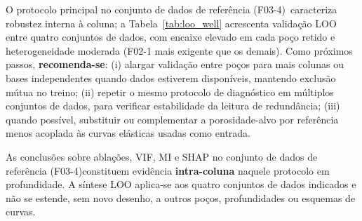 \documentclass[12pt,a4paper]{article}
\newcommand{\dadosref}{conjunto de dados de referência (F03-4)}
\begin{document}
O protocolo principal no \dadosref\ caracteriza robustez interna à coluna; a
Tabela~\ref{tab:loo_well} acrescenta validação LOO entre quatro conjuntos de dados, com encaixe
elevado em cada poço retido e heterogeneidade moderada (F02-1 mais exigente que os
demais). Como próximos passos, \textbf{recomenda-se}: (i) alargar validação entre poços
para mais colunas ou bases independentes quando dados estiverem disponíveis, mantendo
exclusão mútua no treino; (ii) repetir o mesmo protocolo de diagnóstico em múltiplos
conjuntos de dados, para verificar estabilidade da leitura de redundância; (iii) quando possível,
substituir ou complementar a porosidade-alvo por referência menos acoplada às curvas
elásticas usadas como entrada.

As conclusões sobre ablações, VIF, MI e SHAP no \dadosref constituem evidência
\textbf{intra-coluna} naquele protocolo em profundidade. A síntese LOO aplica-se aos
quatro conjuntos de dados indicados e não se estende, sem novo desenho, a outros poços,
profundidades ou esquemas de curvas.



\end{document}
